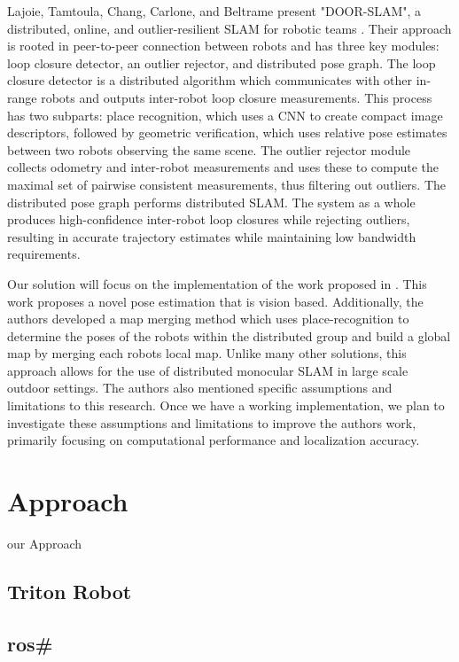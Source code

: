 \documentclass[11pt, conference]{IEEEtran}
\begin{document}
Lajoie, Tamtoula, Chang, Carlone, and Beltrame present "DOOR-SLAM", a distributed, online, and outlier-resilient SLAM for robotic teams \cite{Lajoie2020DOORSLAM}. Their approach is rooted in peer-to-peer connection between robots and has three key modules: loop closure detector, an outlier rejector, and distributed pose graph. The loop closure detector is a distributed algorithm which communicates with other in-range robots and outputs inter-robot loop closure measurements. This process has two subparts: place recognition, which uses a CNN to create compact image descriptors, followed by geometric verification, which uses relative pose estimates between two robots observing the same scene.  The outlier rejector module collects odometry and inter-robot measurements and uses these to compute the maximal set of pairwise consistent measurements, thus filtering out outliers. The distributed pose graph performs distributed SLAM. The system as a whole produces high-confidence inter-robot loop closures while rejecting outliers, resulting in accurate trajectory estimates while maintaining low bandwidth requirements.

Our solution will focus on the implementation of the work proposed in \cite{monocular}. This work proposes a novel pose estimation that is vision based. Additionally, the authors developed a map merging method which uses place-recognition to determine the poses of the robots within the distributed group and build a global map by merging each robots local map. Unlike many other solutions, this approach allows for the use of distributed monocular SLAM in large scale outdoor settings. The authors also mentioned specific assumptions and limitations to this research. Once we have a working implementation, we plan to investigate these assumptions and limitations to improve the authors work, primarily focusing on computational performance and localization accuracy.


\section{Approach}
our Approach
\subsection{Triton Robot}
\subsection{ros\#}
\end{document}
